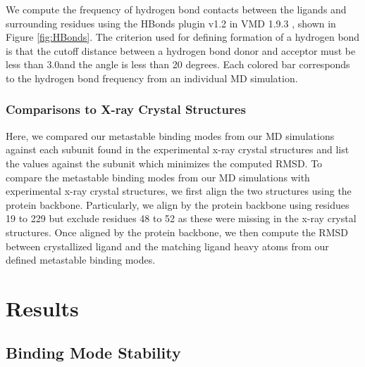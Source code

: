 We compute the frequency of hydrogen bond contacts between the ligands and surrounding residues using the HBonds plugin v1.2 in VMD 1.9.3 \cite{humphrey1996vmd}, shown in Figure \ref{fig:HBonds}.
The criterion used for defining formation of a hydrogen bond is that the cutoff distance between a hydrogen bond donor and acceptor must be less than 3.0\angstrom and the angle is less than 20 degrees.
Each colored bar corresponds to the hydrogen bond frequency from an individual MD simulation.

\subsubsection*{Comparisons to X-ray Crystal Structures}
Here, we compared our metastable binding modes from our MD simulations against each subunit found in the experimental x-ray crystal structures and list the values against the subunit which minimizes the computed RMSD.
To compare the metastable binding modes from our MD simulations with experimental x-ray crystal structures, we first align the two structures using the protein backbone.
Particularly, we align by the protein backbone using residues 19 to 229 but exclude residues 48 to 52 as these were missing in the x-ray crystal structures.
Once aligned by the protein backbone, we then compute the RMSD between crystallized ligand and the matching ligand heavy atoms from our defined metastable binding modes.

\section{Results}

\subsection{Binding Mode Stability}

